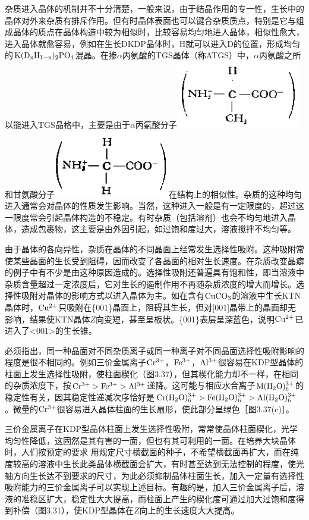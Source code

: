 杂质进入晶体的机制井不十分清楚，一般来说，由于结晶作用的专一性，生长中的晶体对外来杂质有排斥作用。但有时晶体表面也可以键合杂质质点，特别是它与组成晶体的质点在晶体构造中较为相似时，比较容易均匀地进人晶体，相似性愈大，进入晶体就愈容易，例如在生长DKDP晶体时，H就可以进入D的位置，形成均匀的$\rm K(D_xH_{1-x})_2PO_4$混晶。在掺$\alpha$丙氨酸的TGS晶体（称ATGS）中，$\alpha$丙氨酸之所以能进入TGS晶格中，主要是由于$\alpha$丙氨酸分子\includegraphics[height=10ex]{fig/cp03/fml4.1.jpg}和甘氨酸分子\includegraphics[height=10ex]{fig/cp03/fml4.2.jpg}在结构上的相似性。杂质的这种均匀进入通常会对晶体的性质发生影响。当然，这种进入一般是有一定限度的，超过这一限度常会引起晶体构造的不稳定。有时杂质（包括溶剂）也会不均匀地进入晶体，造成包裹物，这主要是由外因引起，如过饱和度过大，溶液搅拌不均匀等。

由于晶体的各向异性，杂质在晶体的不同晶面上经常发生选择性吸附。这种吸附常使某些晶面的生长受到阻碍，因而改变了各晶面的相对生长速度。在杂质改变晶癖的例子中有不少是由这种原因造成的。选择性吸附还普遍具有饱和性，即当溶液中杂质含量超过一定浓度后，它对生长的遏制作用不再随杂质浓度的增大而增长。选择性吸附对晶体的影响方式以进入晶体为主。如在含有$\rm CuCO_3$的溶液中生长KTN晶体时，$\rm Cu^{2+}$只吸附在\{001\}晶面上，阻碍其生长，但对[001]晶带上的晶面却无影响，结果使KTN晶体$Z$向变短，甚至呈板状。\{001\}表层呈深蓝色，说明$\rm Cu^{2+}$已进入了<001>的生长锥。

必须指出，同一种晶面对不同杂质离子或同一种离子对不同晶面选择性吸附影响的程度是很不相同的。例如三价金属离子$\rm Cr^{3+}$，$\rm Fe^{3+}$，$\rm Al^{3+}$很容易在KDP型晶体的柱面上发生选择性吸附，使柱面楔化（图3.37），但其楔化能力却不一样，在相同的杂质浓度下，按$\rm Cr^{3+}>Fe^{3+}>Al^{3+}$递降。这可能与相应水合离子$\rm M(H_2O)_6^{3+}$的稳定性有关，因其稳定性递减次序恰好是$\rm Cr(H_2O)_6^{3+}>Fe(H_2O)_6^{3+}>Al(H_2O)_6^{3+}$。微量的$\rm Cr^{3+}$很容易进入晶体柱面的生长扇形，使此部分呈绿色［图3.37(c)］。

三价金属离子在KDP型晶体柱面上发生选择性吸附，常常使晶体柱面楔化，光学均匀性降低，这固然是其有害的一面，但也有其可利用的一面。在培养大块晶体时，人们按预定的要求 用规定尺寸横截面的种子，不希望横截面再扩大，而在纯度较高的溶液中生长此类晶体横截面会扩大，有时甚至达到无法控制的程度，使光轴方向生长达不到要求的尺寸，为此必须抑制晶体柱面生长，加入一定量有选择性吸附能力的三价金属离子可以实现上述目标。有趣的是，加入三价金属离子后，溶液的准稳区扩大，稳定性大大提高，而柱面上产生的楔化度可通过加大过饱和度得到补偿（图3.31），使KDP型晶体在$Z$向上的生长速度大大提高。


